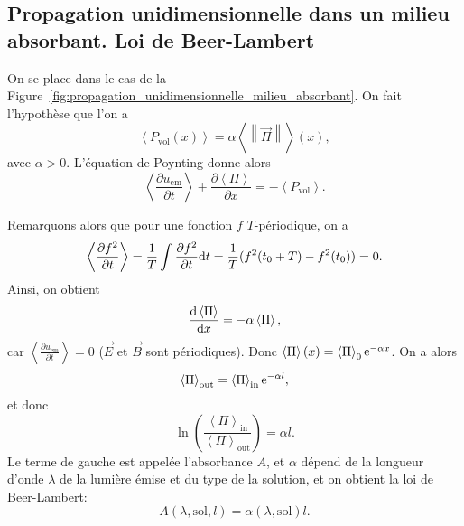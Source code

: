 \subsection{Propagation unidimensionnelle dans un milieu absorbant. Loi de Beer-Lambert}

On se place dans le cas de la Figure~\ref{fig:propagation_unidimensionnelle_milieu_absorbant}. On fait l'hypothèse que l'on a
\begin{equation*}
    \left\langle P_{\mathrm{vol}}(x)\right\rangle=\alpha\left\langle\left\lVert\vec{\Pi}\right\rVert\right\rangle(x),
\end{equation*}
avec $\alpha>0$. L'équation de Poynting donne alors
\begin{equation*}
    \left\langle\frac{\partial u_{\mathrm{em}}}{\partial t}\right\rangle+\frac{\partial\left\langle\Pi\right\rangle}{\partial x}=-\left\langle P_{\mathrm{vol}}\right\rangle.
\end{equation*}

Remarquons alors que pour une fonction $f$ $T$-périodique, on a
\begin{equation*}
    \left\langle\frac{\partial f^{2}}{\partial t}\right\rangle=\frac{1}{T}\int\frac{\partial f^{2}}{\partial t}\mathrm{d} t=\frac{1}{T}(f^{2}(t_0+T)-f^{2}(t_0))=0.
\end{equation*}
Ainsi, on obtient
\begin{equation*}
    \frac{\mathrm{d}\left\langle\Pi\right\rangle}{\mathrm{d} x}=-\alpha\left\langle\Pi\right\rangle,
\end{equation*}
car $\left\langle\frac{\partial u_{\mathrm{em}}}{\partial t}\right\rangle=0$ ($\vec{E}$ et $\vec{B}$ sont périodiques). Donc $\left\langle \Pi\right\rangle(x)=\left\langle\Pi\right\rangle_{0}\mathrm{e}^{-\alpha x}$. On a alors 
\begin{equation*}
    \left\langle\Pi\right\rangle_{\mathrm{out}}=\left\langle\Pi\right\rangle_{\mathrm{in}}\mathrm{e}^{-\alpha l},
\end{equation*}
et donc 
\begin{equation*}
    \ln\left(
        \frac{\left\langle\Pi\right\rangle_{\mathrm{in}}}{\left\langle\Pi\right\rangle_{\mathrm{out}}}
    \right)=\alpha l.
\end{equation*}
Le terme de gauche est appelée l'absorbance $A$, et $\alpha$ dépend de la longueur d'onde $\lambda$ de la lumière émise et du type de la solution, et on obtient la loi de Beer-Lambert:
\begin{equation*}
    \boxed{
        A(\lambda,\mathrm{sol},l)=\alpha(\lambda,\mathrm{sol})l.
    }
\end{equation*}

